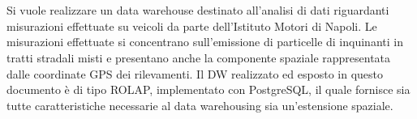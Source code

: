 \chapter*{}
Si vuole realizzare un data warehouse destinato all’analisi di dati riguardanti misurazioni effettuate su veicoli da parte dell’Istituto Motori di Napoli.
Le misurazioni effettuate si concentrano sull'emissione di particelle di inquinanti in tratti stradali misti e presentano anche la componente spaziale rappresentata dalle coordinate GPS dei rilevamenti.
Il DW realizzato ed esposto in questo documento è di tipo ROLAP, implementato con PostgreSQL, il quale fornisce sia tutte caratteristiche necessarie al data warehousing sia un’estensione spaziale.